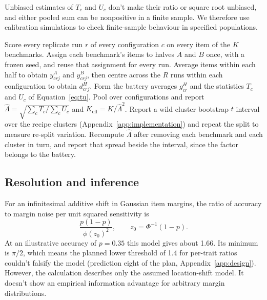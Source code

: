 \documentclass{article}
\newcommand{\Lam}{\Lambda}
\begin{document}
Unbiased estimates of $T_c$ and $U_c$ don't make their ratio or square root unbiased, and either pooled sum can be nonpositive in a finite sample. We therefore use calibration simulations to check finite-sample behaviour in specified populations.

\begin{algorithm}[t]
\caption{SNAP measurement recipe for a fixed battery of $K$ benchmarks scored on $R$ replicate runs per configuration. The primary analysis below used a random frozen split and checked a passage-aware split, and the registered test kept passage-linked items in one half.}
\label{alg:snap}
\begin{algorithmic}[1]
\STATE Score every replicate run $r$ of every configuration $c$ on every item of the $K$ benchmarks.
\STATE Assign each benchmark's items to halves $A$ and $B$ once, with a frozen seed, and reuse that assignment for every run.
\STATE Average items within each half to obtain $y^A_{crj}$ and $y^B_{crj}$, then centre across the $R$ runs within each configuration to obtain $d^H_{crj}$.
\STATE Form the battery averages $g^H_{cr}$ and the statistics $T_c$ and $U_c$ of Equation~\ref{eq:tu}.
\STATE Pool over configurations and report $\widehat\Lam=\sqrt{\sum_c T_c/\sum_c U_c}$ and $K_{\mathrm{eff}}=K/\widehat\Lam^2$.
\STATE Report a wild cluster bootstrap-$t$ interval over the recipe clusters (Appendix~\ref{app:implementation}) and repeat the split to measure re-split variation.
\STATE Recompute $\widehat\Lam$ after removing each benchmark and each cluster in turn, and report that spread beside the interval, since the factor belongs to the battery.
\end{algorithmic}
\end{algorithm}


\subsection{Resolution and inference}
For an infinitesimal additive shift in Gaussian item margins, the ratio of accuracy to margin noise per unit squared sensitivity is
\begin{equation}
\frac{p(1-p)}{\phi(z_0)^2},\qquad z_0=\Phi^{-1}(1-p).
\label{eq:information}
\end{equation}
At an illustrative accuracy of $p=0.35$ this model gives about 1.66. Its minimum is $\pi/2$, which means the planned lower threshold of 1.4 for per-trait ratios couldn't falsify the model (prediction eight of the plan, Appendix~\ref{app:design}). However, the calculation describes only the assumed location-shift model. It doesn't show an empirical information advantage for arbitrary margin distributions.
\end{document}
